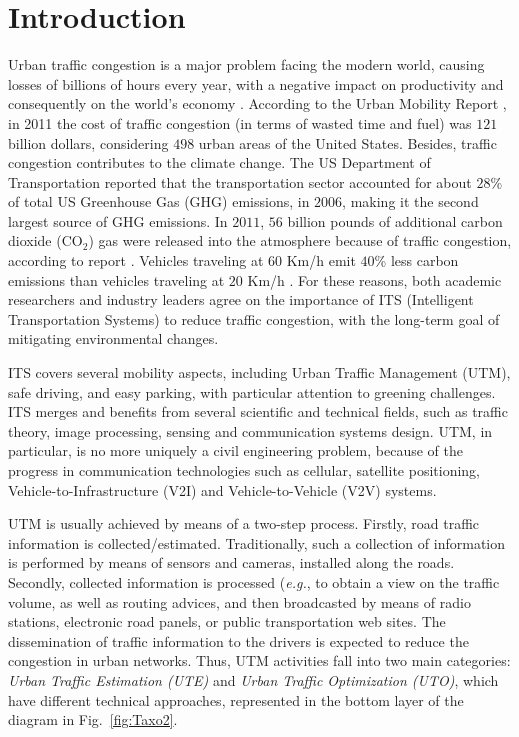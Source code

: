 \documentclass[10pt,onecolumn]{article}
\begin{document}
\section{Introduction}
Urban traffic congestion is a major problem facing the modern world, causing losses of billions of hours every year, with a negative impact on productivity and consequently on the world's economy \cite{Miller2009}. 
According to the Urban Mobility Report \cite{David2012}, in 2011 the cost of traffic congestion (in terms of wasted time and fuel) was $121$ billion dollars, considering $498$ urban areas of the United States.
Besides, traffic congestion contributes to the climate change. 
The US Department of Transportation reported that the transportation sector accounted for about $28$\% of total US Greenhouse Gas (GHG) emissions, in $2006$, making it the second largest source of GHG emissions.
In $2011$, $56$ billion pounds of additional carbon dioxide (CO$_2$) gas were released into the atmosphere because of traffic congestion, according to report \cite{David2012}.
Vehicles traveling at $60$ Km/h emit $40$\% less carbon emissions than vehicles traveling at $20$ Km/h \cite{Ezell2010}. For these reasons, both academic researchers and industry leaders agree on the importance of ITS (Intelligent Transportation Systems) to reduce traffic congestion, with the long-term goal of mitigating environmental changes.

ITS covers several mobility aspects, including Urban Traffic Management (UTM), safe driving, and easy parking, with particular attention to greening challenges. 
ITS merges and benefits from several scientific and technical fields, such as traffic theory, image processing, sensing and communication systems design. 
UTM, in particular, is no more uniquely a civil engineering problem, because of the progress in communication technologies such as cellular, satellite positioning, Vehicle-to-Infrastructure (V2I) and Vehicle-to-Vehicle (V2V) systems.
 
UTM is usually achieved by means of a two-step process. Firstly, road traffic information is collected/estimated. Traditionally, such a collection of information is performed by means of sensors and cameras, installed along the roads. Secondly, collected information is processed (\textit{e.g.}, to obtain a view on the traffic volume, as well as routing advices, and then broadcasted by means of radio stations, electronic road panels, or public transportation web sites. The dissemination of traffic information to the drivers is expected to reduce the congestion in urban networks. 
Thus, UTM activities fall into two main categories: \textit{Urban Traffic Estimation (UTE)} and \textit{Urban Traffic Optimization (UTO)}, which have different technical approaches, represented in the bottom layer of the diagram in Fig.~\ref{fig:Taxo2}.
\end{document}
